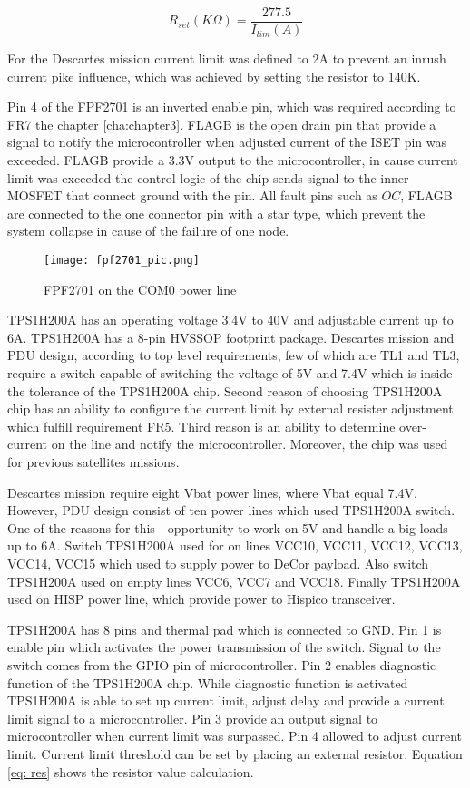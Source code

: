 \begin{equation}\label{eq:fpf}
R_{set}(K\Omega) = \frac{277.5}{I_{lim}(A)}
\end{equation}

For the Descartes mission current limit was defined to 2A to prevent an inrush current pike influence, which was achieved by setting the resistor to 140K.

Pin 4 of the FPF2701 is an inverted enable pin, which was required according to FR7 the chapter \ref{cha:chapter3}. FLAGB is the open drain pin that provide a signal to notify the microcontroller when adjusted current of the ISET pin was exceeded. FLAGB provide a 3.3V output to the microcontroller, in cause current limit was exceeded the control logic of the chip sends signal to the inner MOSFET that connect ground with the pin. All fault pins such as $\overline{OC}$, FLAGB  are connected to the one connector pin with a star type, which prevent the system collapse in cause of the failure of one node.

\begin{figure}[h]
	\centering
	\texttt{[image: fpf2701\_pic.png]}
	\caption{FPF2701 on the COM0 power line}
	\label{fig: fpf27_schema}
\end{figure} 


TPS1H200A \cite{28} has an operating voltage 3.4V to 40V and adjustable current up to 6A. TPS1H200A has a 8-pin HVSSOP footprint package. Descartes mission and PDU design, according to top level requirements, few of which are TL1 and TL3, require a switch capable of switching the voltage of 5V and 7.4V which is inside the tolerance of the TPS1H200A chip. Second reason of choosing TPS1H200A chip has an ability to configure the current limit by external resister adjustment which fulfill requirement FR5. Third reason is an ability to determine over-current on the line and notify the microcontroller. Moreover, the chip was used for previous satellites missions.

Descartes mission require eight Vbat power lines, where Vbat equal 7.4V. However, PDU design consist of ten power lines which used TPS1H200A switch. One of the reasons for this - opportunity to work on 5V and handle a big loads up to 6A. Switch TPS1H200A used for on lines VCC10, VCC11, VCC12, VCC13, VCC14, VCC15 which used to supply power to DeCor payload. Also switch TPS1H200A used on empty lines VCC6, VCC7 and VCC18. Finally TPS1H200A used on HISP power line, which provide power to Hispico transceiver. 

TPS1H200A has 8 pins and thermal pad which is connected to GND. Pin 1 is enable pin which activates the power transmission of the switch. Signal to the switch comes from the GPIO pin of microcontroller. Pin 2 enables diagnostic function of the TPS1H200A chip. While diagnostic function is activated TPS1H200A is able to set up current limit, adjust delay and provide a current limit signal to a microcontroller. Pin 3 provide an output signal to microcontroller when current limit was surpassed. Pin 4 allowed to adjust current limit. Current limit threshold can be set by placing an external resistor. Equation \ref{eq: res} shows the resistor value calculation.

